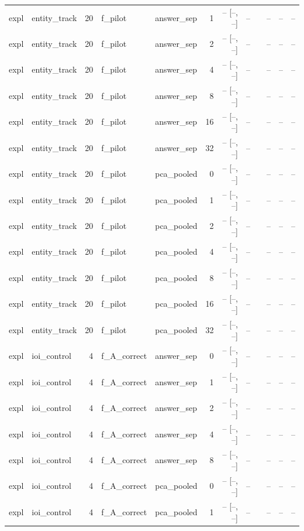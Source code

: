 \begin{tabular}{llrllrrrlrrr}
expl & entity\_track & 20 & f\_pilot & answer\_sep & 1 & -- [--, --] & -- &  & -- & -- & -- \\
expl & entity\_track & 20 & f\_pilot & answer\_sep & 2 & -- [--, --] & -- &  & -- & -- & -- \\
expl & entity\_track & 20 & f\_pilot & answer\_sep & 4 & -- [--, --] & -- &  & -- & -- & -- \\
expl & entity\_track & 20 & f\_pilot & answer\_sep & 8 & -- [--, --] & -- &  & -- & -- & -- \\
expl & entity\_track & 20 & f\_pilot & answer\_sep & 16 & -- [--, --] & -- &  & -- & -- & -- \\
expl & entity\_track & 20 & f\_pilot & answer\_sep & 32 & -- [--, --] & -- &  & -- & -- & -- \\
expl & entity\_track & 20 & f\_pilot & pca\_pooled & 0 & -- [--, --] & -- &  & -- & -- & -- \\
expl & entity\_track & 20 & f\_pilot & pca\_pooled & 1 & -- [--, --] & -- &  & -- & -- & -- \\
expl & entity\_track & 20 & f\_pilot & pca\_pooled & 2 & -- [--, --] & -- &  & -- & -- & -- \\
expl & entity\_track & 20 & f\_pilot & pca\_pooled & 4 & -- [--, --] & -- &  & -- & -- & -- \\
expl & entity\_track & 20 & f\_pilot & pca\_pooled & 8 & -- [--, --] & -- &  & -- & -- & -- \\
expl & entity\_track & 20 & f\_pilot & pca\_pooled & 16 & -- [--, --] & -- &  & -- & -- & -- \\
expl & entity\_track & 20 & f\_pilot & pca\_pooled & 32 & -- [--, --] & -- &  & -- & -- & -- \\
expl & ioi\_control & 4 & f\_A\_correct & answer\_sep & 0 & -- [--, --] & -- &  & -- & -- & -- \\
expl & ioi\_control & 4 & f\_A\_correct & answer\_sep & 1 & -- [--, --] & -- &  & -- & -- & -- \\
expl & ioi\_control & 4 & f\_A\_correct & answer\_sep & 2 & -- [--, --] & -- &  & -- & -- & -- \\
expl & ioi\_control & 4 & f\_A\_correct & answer\_sep & 4 & -- [--, --] & -- &  & -- & -- & -- \\
expl & ioi\_control & 4 & f\_A\_correct & answer\_sep & 8 & -- [--, --] & -- &  & -- & -- & -- \\
expl & ioi\_control & 4 & f\_A\_correct & pca\_pooled & 0 & -- [--, --] & -- &  & -- & -- & -- \\
expl & ioi\_control & 4 & f\_A\_correct & pca\_pooled & 1 & -- [--, --] & -- &  & -- & -- & -- \\

\end{tabular}
